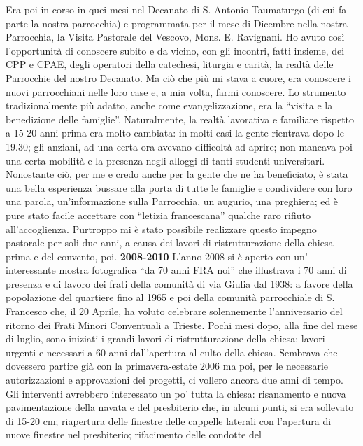 Era poi in corso in quei mesi nel Decanato di S. Antonio Taumaturgo (di cui fa parte la nostra 
parrocchia) e programmata per il mese di Dicembre nella nostra Parrocchia, la Visita Pastorale del 
Vescovo, Mons. E. Ravignani.
Ho avuto così l'opportunità di conoscere subito e da vicino, con gli incontri, fatti insieme, dei CPP e 
CPAE, degli operatori della catechesi, liturgia e carità, la realtà delle Parrocchie del nostro 
Decanato. Ma ciò che più mi stava a cuore, era conoscere i nuovi parrocchiani nelle loro case e, a 
mia volta, farmi conoscere.
Lo strumento tradizionalmente più adatto, anche come evangelizzazione, era la “visita e la 
benedizione delle famiglie”. Naturalmente, la realtà lavorativa e familiare rispetto a 15-20 anni 
prima era molto cambiata: in molti casi la gente rientrava dopo le 19.30; gli anziani, ad una certa 
ora avevano difficoltà ad aprire; non mancava poi una certa mobilità e la presenza negli alloggi di 
tanti studenti universitari. 
Nonostante ciò, per me e credo anche per la gente che ne ha beneficiato, è stata una bella esperienza 
bussare alla porta di tutte le famiglie e condividere con loro una parola, un'informazione sulla 
Parrocchia, un augurio, una preghiera; ed è pure stato facile accettare con “letizia francescana” 
qualche raro rifiuto all'accoglienza. Purtroppo mi è stato possibile realizzare questo impegno 
pastorale per soli due anni, a causa dei lavori di ristrutturazione della chiesa prima e del convento, 
poi.
\bigbreak
\noindent \textbf{2008-2010}
\medbreak
\noindent L'anno 2008 si è aperto con un' interessante mostra fotografica “da 70 anni FRA noi” che 
illustrava i 70 anni di presenza e di lavoro dei frati della comunità di via Giulia dal 1938: a favore 
della popolazione del quartiere fino al 1965 e poi della comunità parrocchiale di S. Francesco che, il 
20 Aprile, ha voluto celebrare solennemente l'anniversario del ritorno dei Frati Minori Conventuali 
a Trieste.
Pochi mesi dopo, alla fine del mese di luglio, sono iniziati i grandi lavori di ristrutturazione della 
chiesa: lavori urgenti e necessari a 60 anni dall'apertura al culto della chiesa.
Sembrava che dovessero partire già con la primavera-estate 2006 ma poi, per le necessarie 
autorizzazioni e approvazioni dei progetti, ci vollero ancora due anni di tempo.
Gli interventi avrebbero interessato un po' tutta la chiesa: risanamento e nuova pavimentazione della 
navata e del presbiterio che, in alcuni punti, si era sollevato di 15-20 cm; riapertura delle finestre 
delle cappelle laterali con l'apertura di nuove finestre nel presbiterio; rifacimento delle condotte del 
